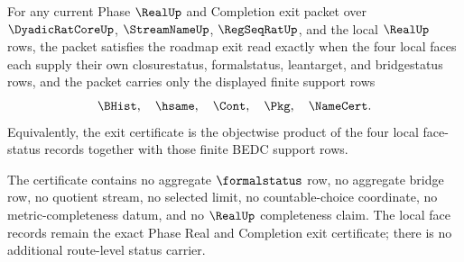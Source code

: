 \begin{theorem}
\label{thm:real-l10-objectwise-face-status-exit}
For any current Phase $\RealUp$ and Completion exit packet over $\DyadicRatCoreUp$, $\StreamNameUp$, $\RegSeqRatUp$, and the local $\RealUp$ rows, the packet satisfies the roadmap exit read exactly when the four local faces each supply their own closurestatus, formalstatus, leantarget, and bridgestatus rows, and the packet carries only the displayed finite support rows
$$
\BHist,\quad \hsame,\quad \Cont,\quad \Pkg,\quad \NameCert.
$$
Equivalently, the exit certificate is the objectwise product of the four local face-status records together with those finite BEDC support rows.

The certificate contains no aggregate $\formalstatus$ row, no aggregate bridge row, no quotient stream, no selected limit, no countable-choice coordinate, no metric-completeness datum, and no $\RealUp$ completeness claim. The local face records remain the exact Phase Real and Completion exit certificate; there is no additional route-level status carrier.
\end{theorem}
